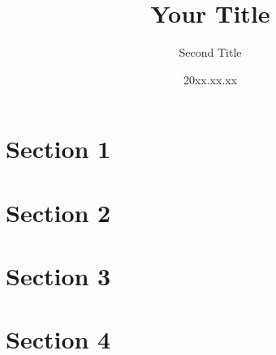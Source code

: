 \documentclass{beamer}
\title[Short Title]{Your Title}
\author[xxxx]{Second Title}
\institute[Group]{Member1, Member2}
\date{20xx.xx.xx}
\begin{document}
\begin{frame}
\titlepage
\end{frame}


\section{Section 1}


\section{Section 2}


\section{Section 3}


\section{Section 4}

\end{document}
